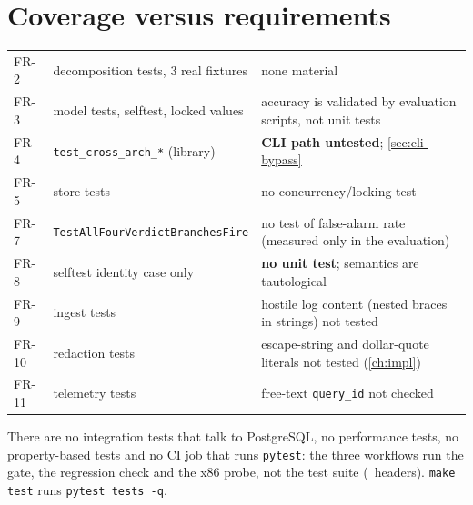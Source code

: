\section{Coverage versus requirements}
\begin{center}\small
\begin{tabularx}{\textwidth}{@{}L{1.4cm}L{3.9cm}Y@{}}
\toprule {} &  & \\ \midrule
FR-2 & decomposition tests, 3 real fixtures & none material\\
FR-3 & model tests, selftest, locked values & accuracy is validated by evaluation scripts, not unit tests\\
FR-4 & \texttt{test\_cross\_arch\_*} (library) & \textbf{CLI path untested}; \cref{sec:cli-bypass}\\
FR-5 & store tests & no concurrency/locking test\\
FR-7 & \texttt{TestAllFourVerdictBranchesFire} & no test of false-alarm rate (measured only in the evaluation)\\
FR-8 & selftest identity case only & \textbf{no unit test}; semantics are tautological\\
FR-9 & ingest tests & hostile log content (nested braces in strings) not tested\\
FR-10 & redaction tests & escape-string and dollar-quote literals not tested (\cref{ch:impl})\\
FR-11 & telemetry tests & free-text \texttt{query\_id} not checked\\
\bottomrule
\end{tabularx}
\end{center}
There are no integration tests that talk to PostgreSQL, no performance tests, no property-based tests and no CI job that runs \texttt{pytest}: the three workflows run the gate, the regression check and the x86 probe, not the test suite (\evCODE\ headers). \texttt{make test} runs \texttt{pytest tests -q}.

